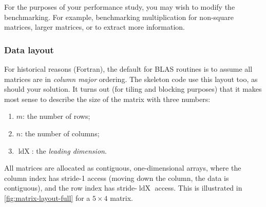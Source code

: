 \documentclass[a4paper]{article}
\begin{document}
For the purposes of your performance study, you may wish to modify the
benchmarking.  For example, benchmarking multiplication for non-square
matrices, larger matrices, or to extract more information.

\subsubsection{Data layout}
\label{sec:data-layout}
For historical reasons (Fortran), the default for BLAS routines is to
assume all matrices are in \emph{column major} ordering.  The skeleton
code use this layout too, as should your solution.  It turns out
(for tiling and blocking purposes) that it makes most sense to
describe the size of the matrix with three numbers:
\begin{enumerate}
\item $m$: the number of rows;
\item $n$: the number of columns;
\item $\operatorname{ldX}$: the \emph{leading dimension}.
\end{enumerate}
All matrices are allocated as contiguous, one-dimensional arrays,
where the column index has stride-1 access (moving down the column,
the data is contiguous), and the row index has
stride-$\operatorname{ldX}$ access.  This is illustrated in
\cref{fig:matrix-layout-full} for a $5\times 4$ matrix.
\end{document}
